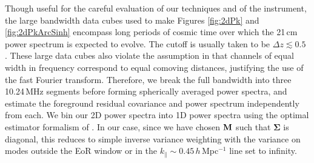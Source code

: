 Though useful for the careful evaluation of our techniques and of the instrument, the large bandwidth data cubes used to make Figures \ref{fig:2dPk} and \ref{fig:2dPkArcSinh} encompass long periods of cosmic time over which the 21\,cm power spectrum is expected to evolve. The cutoff is usually taken to be $\Delta z \lesssim 0.5$ \citep{mao08}. These large data cubes also violate the assumption in \citet{DillonFast} that channels of equal width in frequency correspond to equal comoving distances, justifying the use of the fast Fourier transform. Therefore, we break the full bandwidth into three 10.24\,MHz segments before forming spherically averaged power spectra, and estimate the foreground residual covariance and power spectrum independently from each. We bin our 2D power spectra into 1D power spectra using the optimal estimator formalism of \citet{X13}. In our case, since we have chosen $\mathbf{M}$ such that $\boldsymbol\Sigma$ is diagonal, this reduces to simple inverse variance weighting with the variance on modes outside the EoR window or in the $k_\| \sim 0.45$\,$h$\,Mpc$^{-1}$ line set to infinity.


